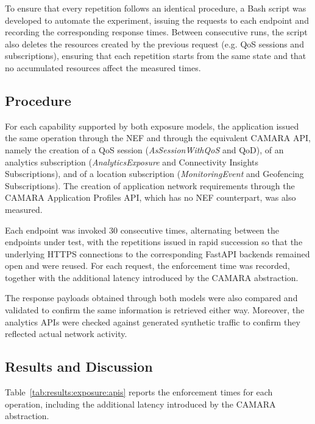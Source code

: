 To ensure that every repetition follows an identical procedure, a Bash script was developed to automate the experiment, issuing the requests to each endpoint and recording the corresponding response times. Between consecutive runs, the script also deletes the resources created by the previous request (e.g. \acs{QoS} sessions and subscriptions), ensuring that each repetition starts from the same state and that no accumulated resources affect the measured times.

\subsection{Procedure}
\label{chap:results:exposure:procedure}

For each capability supported by both exposure models, the application issued the same operation through the \acs{NEF} and through the equivalent CAMARA \acs{API}, namely the creation of a \acs{QoS} session (\textit{AsSessionWithQoS} and \acs{QoD}), of an analytics subscription (\textit{AnalyticsExposure} and Connectivity Insights Subscriptions), and of a location subscription (\textit{MonitoringEvent} and Geofencing Subscriptions). The creation of application network requirements through the CAMARA Application Profiles \acs{API}, which has no \acs{NEF} counterpart, was also measured.

Each endpoint was invoked 30 consecutive times, alternating between the endpoints under test, with the repetitions issued in rapid succession so that the underlying \acs{HTTPS} connections to the corresponding Fast\acs{API} backends remained open and were reused. For each request, the enforcement time was recorded, together with the additional latency introduced by the CAMARA abstraction.

The response payloads obtained through both models were also compared and validated to confirm the same information is retrieved either way. Moreover, the analytics \acsp{API} were checked against generated synthetic traffic to confirm they reflected actual network activity.

\subsection{Results and Discussion}
\label{chap:results:exposure:discussion}

Table~\ref{tab:results:exposure:apis} reports the enforcement times for each operation, including the additional latency introduced by the CAMARA abstraction.



